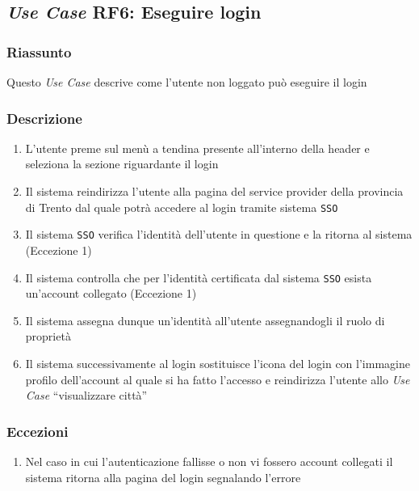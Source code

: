     \subsection{\textit{Use Case} RF6: Eseguire login}
        \subsubsection{Riassunto}
            Questo \textit{Use Case} descrive come l'utente non loggato può eseguire il login
        \subsubsection{Descrizione}
            \begin{enumerate}
                \item L'utente preme sul menù a tendina presente all'interno della header e seleziona la sezione riguardante il login
                \item Il sistema reindirizza l'utente alla pagina del service provider della provincia di Trento dal quale potrà accedere al login tramite sistema \texttt{SSO}
                \item Il sistema \texttt{SSO} verifica l'identità dell'utente in questione e la ritorna al sistema (Eccezione 1)
                \item Il sistema controlla che per l'identità certificata dal sistema \texttt{SSO} esista un'account collegato (Eccezione 1)
                \item Il sistema assegna dunque un'identità all'utente assegnandogli il ruolo di proprietà
                \item Il sistema successivamente al login sostituisce l'icona del login con l'immagine profilo dell'account al quale si ha fatto l'accesso e reindirizza l'utente allo \textit{Use Case} ``visualizzare città''
            \end{enumerate}
        \subsubsection{Eccezioni}
            \begin{enumerate}
                \item Nel caso in cui l'autenticazione fallisse o non vi fossero account collegati il sistema ritorna alla pagina del login segnalando l'errore
            \end{enumerate}


